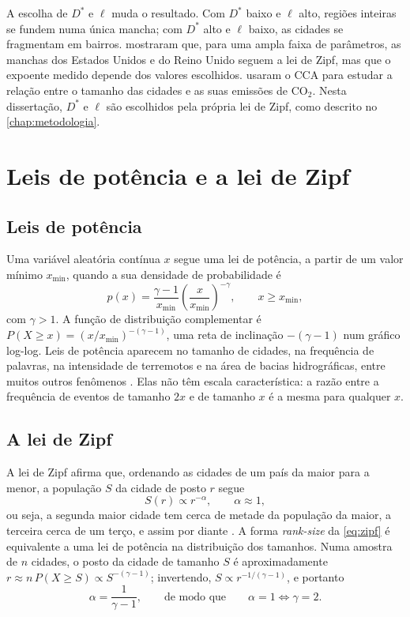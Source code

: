 A escolha de $D^{*}$ e $\ell$ muda o resultado. Com $D^{*}$ baixo e $\ell$ alto, regiões inteiras se fundem numa única mancha; com $D^{*}$ alto e $\ell$ baixo, as cidades se fragmentam em bairros.  mostraram que, para uma ampla faixa de parâmetros, as manchas dos Estados Unidos e do Reino Unido seguem a lei de Zipf, mas que o expoente medido depende dos valores escolhidos.  usaram o CCA para estudar a relação entre o tamanho das cidades e as suas emissões de CO$_2$. Nesta dissertação, $D^{*}$ e $\ell$ são escolhidos pela própria lei de Zipf, como descrito no \autoref{chap:metodologia}.

\section{Leis de potência e a lei de Zipf}
\label{sec:leis-potencia}

\subsection{Leis de potência}

Uma variável aleatória contínua $x$ segue uma lei de potência, a partir de um valor mínimo $x_{\min}$, quando a sua densidade de probabilidade é
\begin{equation}
	p(x) = \frac{\gamma - 1}{x_{\min}} \left( \frac{x}{x_{\min}} \right)^{-\gamma}, \qquad x \geq x_{\min},
	\label{eq:lei-potencia}
\end{equation}
com $\gamma > 1$. A função de distribuição complementar é $P(X \geq x) = (x / x_{\min})^{-(\gamma - 1)}$, uma reta de inclinação $-(\gamma-1)$ num gráfico log-log. Leis de potência aparecem no tamanho de cidades, na frequência de palavras, na intensidade de terremotos e na área de bacias hidrográficas, entre muitos outros fenômenos \cite{newman2005}. Elas não têm escala característica: a razão entre a frequência de eventos de tamanho $2x$ e de tamanho $x$ é a mesma para qualquer $x$.

\subsection{A lei de Zipf}

A lei de Zipf afirma que, ordenando as cidades de um país da maior para a menor, a população $S$ da cidade de posto $r$ segue
\begin{equation}
	S(r) \propto r^{-\alpha}, \qquad \alpha \approx 1,
	\label{eq:zipf}
\end{equation}
ou seja, a segunda maior cidade tem cerca de metade da população da maior, a terceira cerca de um terço, e assim por diante \cite{zipf1949}. A forma \textit{rank-size} da \autoref{eq:zipf} é equivalente a uma lei de potência na distribuição dos tamanhos. Numa amostra de $n$ cidades, o posto da cidade de tamanho $S$ é aproximadamente $r \approx n\, P(X \geq S) \propto S^{-(\gamma - 1)}$; invertendo, $S \propto r^{-1/(\gamma - 1)}$, e portanto
\begin{equation}
	\alpha = \frac{1}{\gamma - 1}, \qquad \text{de modo que} \qquad \alpha = 1 \iff \gamma = 2 .
	\label{eq:alpha-gamma}
\end{equation}

